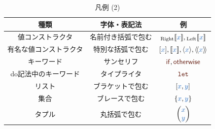 \documentclass[a5paper,twoside,fleqn,draft]{jsbook}
\def\[{[\![}
\def\]{]\!]}
\def\llangle{\langle\!\langle}
\def\rrangle{\rangle\!\rangle}
\def\keywordColor{Sepia}
\def\varColor{NavyBlue}
\def\typeConstColor{Maroon}
\newcommand{\Langle}{\llangle}
\newcommand{\Rangle}{\rrangle}
\newcommand{\mKeyword}[1]{\textcolor{\keywordColor}{\mathsf{#1}}}
\newcommand{\mVarKeyword}[1]{\textcolor{\keywordColor}{\texttt{#1}}}
\newcommand{\mDoLetKeyword}{\mVarKeyword{let}}
\newcommand{\mIfKeyword}{\mKeyword{if}}
\newcommand{\mOtherwiseKeyword}{\mKeyword{otherwise}}
\newcommand{\mTypeConstructor}[1]{\textcolor{\typeConstColor}{\textbf{\textit{#1}}}}
\newcommand{\mSpecialTypeConstructor}[1]{\textcolor{\typeConstColor}{\textbf{#1}}}
\DeclareMathOperator{\mIf}{\mIfKeyword}
\DeclareMathOperator{\mOtherwise}{\mOtherwiseKeyword}
\newcommand{\mVar}[1]{\textcolor{\varColor}{#1}}
\newcommand{\mXVar}{\mVar{x}}
\newcommand{\mYVar}{\mVar{y}}
\newcommand{\mZVar}{\mVar{z}}
\DeclareMathOperator{\mListTypeConstructor}{\mSpecialTypeConstructor{List}}
\DeclareMathOperator{\mMaybeTypeConstructor}{\mSpecialTypeConstructor{Maybe}}
\newcommand{\mValueConstructor}[1]{\mathrm{#1}}
\newcommand{\mValueWith}[2]{{}_\mValueConstructor{#1}\[\mVar{#2}\]}
\newcommand{\mLeftWith}[1]{\mValueWith{Left}{#1}}
\newcommand{\mRightWith}[1]{\mValueWith{Right}{#1}}
\newcommand{\mArrowWith}[1]{\Langle\mVar{#1}\Rangle}
\newcommand{\mConstWith}[1]{\langle\mVar{#1}\rangle}
\newcommand{\mPureWith}[1]{\[\mVar{#1}\]}
\newcommand{\mPairWith}[2]{\begin{pmatrix}#1\\#2\end{pmatrix}}
\begin{document}
\begin{table}[p]
\caption{凡例 (2)}
\begin{center}
\begin{tabular}{||c|c|c||}
\hline
種類&字体・表記法&例\\
\hline\hline
値コンストラクタ&名前付き括弧で包む&$\mRightWith{x},\mLeftWith{x}$\\
有名な値コンストラクタ&特別な括弧で包む&$[\mXVar],\mPureWith{x},\mConstWith{x},\mArrowWith{x}$\\
\hline
キーワード&サンセリフ&$\mIf,\mOtherwise$\\
do記法中のキーワード&タイプライタ&$\mDoLetKeyword$\\
\hline
リスト&ブラケットで包む&$[\mXVar,\mYVar]$\\
集合&ブレースで包む&$\{\mXVar,\mYVar\}$\\
タプル&丸括弧で包む&$\mPairWith{\mXVar}{\mYVar}$\\
\hline
\end{tabular}
\end{center}
\end{table}
\end{document}

